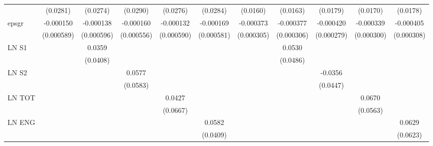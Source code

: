 \begin{table}[htbp]
\begin{tabular}{l*{10}{c}}
                & (0.0281)         & (0.0274)         & (0.0290)         & (0.0276)         & (0.0284)         & (0.0160)         & (0.0163)         & (0.0179)         & (0.0170)         & (0.0178)         \\
epsgr           &-0.000150         &-0.000138         &-0.000160         &-0.000132         &-0.000169         &-0.000373         &-0.000377         &-0.000420         &-0.000339         &-0.000405         \\
                &(0.000589)         &(0.000596)         &(0.000556)         &(0.000590)         &(0.000581)         &(0.000305)         &(0.000306)         &(0.000279)         &(0.000300)         &(0.000308)         \\
LN S1           &                  &   0.0359         &                  &                  &                  &                  &   0.0530         &                  &                  &                  \\
                &                  & (0.0408)         &                  &                  &                  &                  & (0.0486)         &                  &                  &                  \\
LN S2           &                  &                  &   0.0577         &                  &                  &                  &                  &  -0.0356         &                  &                  \\
                &                  &                  & (0.0583)         &                  &                  &                  &                  & (0.0447)         &                  &                  \\
LN TOT          &                  &                  &                  &   0.0427         &                  &                  &                  &                  &   0.0670         &                  \\
                &                  &                  &                  & (0.0667)         &                  &                  &                  &                  & (0.0563)         &                  \\
LN ENG          &                  &                  &                  &                  &   0.0582         &                  &                  &                  &                  &   0.0629         \\
                &                  &                  &                  &                  & (0.0409)         &                  &                  &                  &                  & (0.0623)         \\

\end{tabular}
\end{table}

